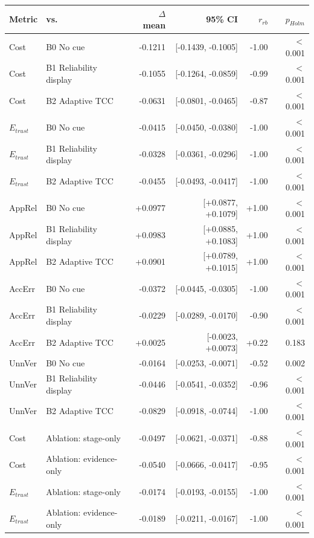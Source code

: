 \begin{tabular}{llrrrr}
\toprule
Metric & vs. & $\Delta$ mean & 95\% CI & $r_{rb}$ & $p_{Holm}$ \\
\midrule
Cost & B0 No cue & -0.1211 & [-0.1439, -0.1005] & -1.00 & $<$0.001 \\
Cost & B1 Reliability display & -0.1055 & [-0.1264, -0.0859] & -0.99 & $<$0.001 \\
Cost & B2 Adaptive TCC & -0.0631 & [-0.0801, -0.0465] & -0.87 & $<$0.001 \\
$E_{trust}$ & B0 No cue & -0.0415 & [-0.0450, -0.0380] & -1.00 & $<$0.001 \\
$E_{trust}$ & B1 Reliability display & -0.0328 & [-0.0361, -0.0296] & -1.00 & $<$0.001 \\
$E_{trust}$ & B2 Adaptive TCC & -0.0455 & [-0.0493, -0.0417] & -1.00 & $<$0.001 \\
AppRel & B0 No cue & +0.0977 & [+0.0877, +0.1079] & +1.00 & $<$0.001 \\
AppRel & B1 Reliability display & +0.0983 & [+0.0885, +0.1083] & +1.00 & $<$0.001 \\
AppRel & B2 Adaptive TCC & +0.0901 & [+0.0789, +0.1015] & +1.00 & $<$0.001 \\
AccErr & B0 No cue & -0.0372 & [-0.0445, -0.0305] & -1.00 & $<$0.001 \\
AccErr & B1 Reliability display & -0.0229 & [-0.0289, -0.0170] & -0.90 & $<$0.001 \\
AccErr & B2 Adaptive TCC & +0.0025 & [-0.0023, +0.0073] & +0.22 & 0.183 \\
UnnVer & B0 No cue & -0.0164 & [-0.0253, -0.0071] & -0.52 & 0.002 \\
UnnVer & B1 Reliability display & -0.0446 & [-0.0541, -0.0352] & -0.96 & $<$0.001 \\
UnnVer & B2 Adaptive TCC & -0.0829 & [-0.0918, -0.0744] & -1.00 & $<$0.001 \\
Cost & Ablation: stage-only & -0.0497 & [-0.0621, -0.0371] & -0.88 & $<$0.001 \\
Cost & Ablation: evidence-only & -0.0540 & [-0.0666, -0.0417] & -0.95 & $<$0.001 \\
$E_{trust}$ & Ablation: stage-only & -0.0174 & [-0.0193, -0.0155] & -1.00 & $<$0.001 \\
$E_{trust}$ & Ablation: evidence-only & -0.0189 & [-0.0211, -0.0167] & -1.00 & $<$0.001 \\
\bottomrule
\end{tabular}